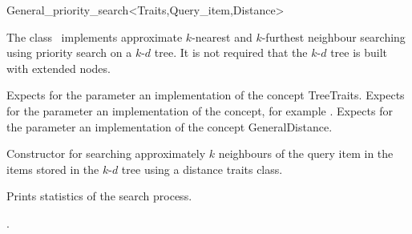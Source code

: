 

\begin{ccRefClass}{General_priority_search<Traits,Query_item,Distance>}  %


\ccDefinition

The class \ccRefName\ implements approximate $k$-nearest and $k$-furthest neighbour searching
using priority search on a $k$-$d$ tree. It is not required that the $k$-$d$ tree is
built with extended nodes.



\ccParameters

Expects for the parameter  an implementation of the concept TreeTraits.
Expects for the parameter   an implementation of the
 concept, for example .
Expects for the parameter  an implementation of the
concept GeneralDistance.

\ccTypes



\ccCreation
{}  %

{Constructor for searching approximately $k$ neighbours of the query item 
in the items stored in the $k$-$d$ tree  using a distance
traits class.}




{
Prints statistics of the search process.
}

\ccSeeAlso

.


\end{ccRefClass}


